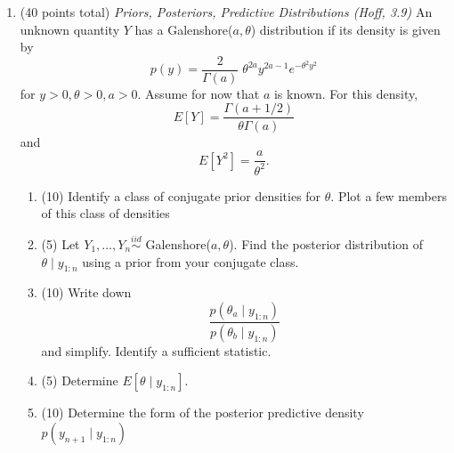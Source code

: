 \documentclass{article}
\begin{document}
\begin{enumerate}
\item (40 points total) {\em Priors, Posteriors, Predictive Distributions (Hoff, 3.9)}
An unknown quantity $Y$ has a Galenshore($a, \theta$) distribution if its density is given by 
$$p(y) = \frac{2}{\Gamma(a)} \; \theta^{2a} y^{2a - 1} e^{-\theta^2 y^2}$$
for $y>0, \theta >0, a>0.$ Assume for now that $a$ is known. For this density, 
$$E[Y] = \frac{\Gamma(a +1/2)}{\theta \Gamma(a)}$$ and 
$$E[Y^2] = \frac{a}{\theta^2}.$$

\begin{enumerate}
\item (10) Identify a class of conjugate prior densities for $\theta$. Plot a few members of this class of densities
\item (5) Let $Y_1, \ldots, Y_n \stackrel{iid}{\sim}$ Galenshore($a, \theta$). Find the posterior distribution of $\theta \mid y_{1:n}$ using a prior from your conjugate class. 
\item (10) Write down $$\frac{p(\theta_a \mid y_{1:n})}{p(\theta_b \mid y_{1:n})}$$ and simplify. Identify a sufficient statistic. 
\item (5) Determine $E[\theta \mid y_{1:n}]$.
\item (10) Determine the form of the posterior predictive density $p(y_{n+1} \mid y_{1:n})$
\end{enumerate}

\end{enumerate}
\end{document}
